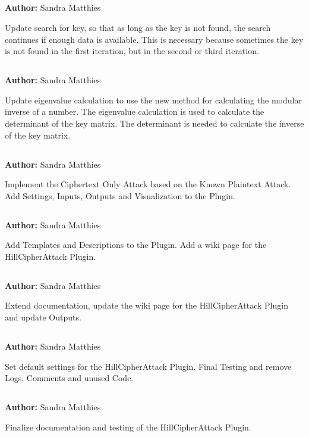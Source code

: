 \documentclass{article}
\begin{document}
\subsection*{}
\textbf{Author:} Sandra Matthies

Update search for key, so that as long as the key is not found, the search continues if enough data is available. This is necessary because sometimes the key is not found in the first iteration, but in the second or third iteration.

\subsection*{}
\textbf{Author:} Sandra Matthies

Update eigenvalue calculation to use the new method for calculating the modular inverse of a number. The eigenvalue calculation is used to calculate the determinant of the key matrix. The determinant is needed to calculate the inverse of the key matrix.

\subsection*{}
\textbf{Author:} Sandra Matthies

Implement the Ciphertext Only Attack based on the Known Plaintext Attack. Add Settings, Inputs, Outputs and Visualization to the Plugin.

\subsection*{}
\textbf{Author:} Sandra Matthies

Add Templates and Descriptions to the Plugin. Add a wiki page for the HillCipherAttack Plugin.

\subsection*{}
\textbf{Author:} Sandra Matthies

Extend documentation, update the wiki page for the HillCipherAttack Plugin and update Outputs.

\subsection*{}
\textbf{Author:} Sandra Matthies

Set default settings for the HillCipherAttack Plugin. Final Testing and remove Logs, Comments and unused Code.

\subsection*{}
\textbf{Author:} Sandra Matthies

Finalize documentation and testing of the HillCipherAttack Plugin.
\end{document}
